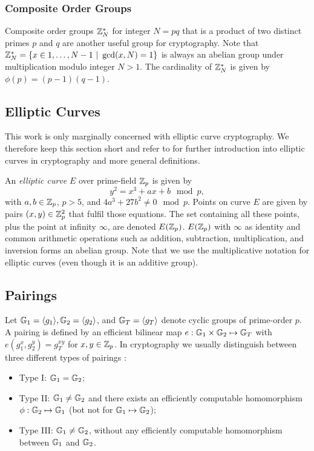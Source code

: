 \subsubsection{Composite Order Groups}
Composite order groups $\ZZ^\ast_N$ for integer $N=pq$ that is a product of two distinct primes $p$ and $q$ are another useful group for cryptography.
Note that $\ZZ^\ast_N=\{x\in{1,\dots,N-1}~|~\gcd(x,N)=1\}$ is always an abelian group under multiplication modulo integer $N>1$.
The cardinality of $\ZZ^\ast_N$ is given by $\phi(p)=(p-1)(q-1)$.

\subsection{Elliptic Curves}
This work is only marginally concerned with elliptic curve cryptography.
We therefore keep this section short and refer to \citet{HankersonMS03} for further introduction into elliptic curves in cryptography and more general definitions.

An \emph{elliptic curve} $E$ over prime-field $\ZZ_p$ is given by 
\[
  y^2 = x^3 + ax + b \mod p,
\]
with $a,b\in\ZZ_p$, $p>5$, and $4a^3 + 27b^2 \not= 0 \mod p$.
Points on curve $E$ are given by pairs $(x,y)\in\ZZ^2_p$ that fulfil those equations.
The set containing all these points, plus the point at infinity $\infty$, are denoted $E(\ZZ_p)$.
$E(\ZZ_p)$ with $\infty$ as identity and common arithmetic operations such as addition, subtraction, multiplication, and inversion forms an abelian group.
Note that we use the multiplicative notation for elliptic curves (even though it is an additive group).

\subsection{Pairings}
Let $\GG_1=\genG[1], \GG_2=\genG[2]$, and $\GG_T=\genG[T]$ denote cyclic groups of prime-order $p$.
A pairing is defined by an efficient bilinear map $e: \GG_1 \times \GG_2 \mapsto \GG_T$ with $e(g_1^x, g_2^y) = g_T^{xy}$ for $x,y\in\ZZ_p$.
In cryptography we usually distinguish between three different types of pairings \cite{GalbraithPS08}:

\begin{itemize}
  \item Type I: $\GG_1 = \GG_2$;
  \item Type II: $\GG_1 \not= \GG_2$ and there exists an efficiently computable homomorphism $\phi: \GG_2 \mapsto \GG_1$ (bot not for $\GG_1 \mapsto \GG_2$);
  \item Type III: $\GG_1 \not= \GG_2$, without any efficiently computable homomorphism between $\GG_1$ and $\GG_2$.
\end{itemize}

